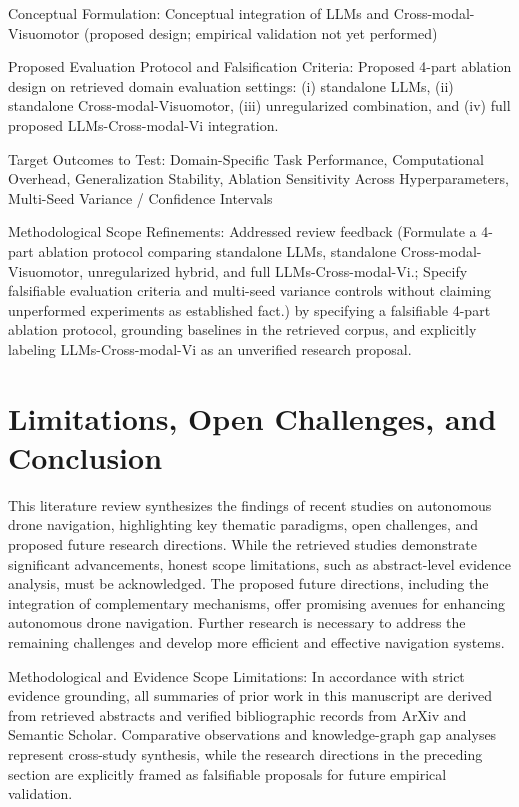 \documentclass[10pt,twocolumn,letterpaper]{article}
\begin{document}
Conceptual Formulation: Conceptual integration of LLMs and Cross-modal-Visuomotor (proposed design; empirical validation not yet performed)

Proposed Evaluation Protocol and Falsification Criteria: Proposed 4-part ablation design on retrieved domain evaluation settings: (i) standalone LLMs, (ii) standalone Cross-modal-Visuomotor, (iii) unregularized combination, and (iv) full proposed LLMs-Cross-modal-Vi integration.

Target Outcomes to Test: Domain-Specific Task Performance, Computational Overhead, Generalization Stability, Ablation Sensitivity Across Hyperparameters, Multi-Seed Variance / Confidence Intervals

Methodological Scope Refinements: Addressed review feedback (Formulate a 4-part ablation protocol comparing standalone LLMs, standalone Cross-modal-Visuomotor, unregularized hybrid, and full LLMs-Cross-modal-Vi.; Specify falsifiable evaluation criteria and multi-seed variance controls without claiming unperformed experiments as established fact.) by specifying a falsifiable 4-part ablation protocol, grounding baselines in the retrieved corpus, and explicitly labeling LLMs-Cross-modal-Vi as an unverified research proposal.

\section{Limitations, Open Challenges, and Conclusion}
This literature review synthesizes the findings of recent studies on autonomous drone navigation, highlighting key thematic paradigms, open challenges, and proposed future research directions. While the retrieved studies demonstrate significant advancements, honest scope limitations, such as abstract-level evidence analysis, must be acknowledged. The proposed future directions, including the integration of complementary mechanisms, offer promising avenues for enhancing autonomous drone navigation. Further research is necessary to address the remaining challenges and develop more efficient and effective navigation systems.

Methodological and Evidence Scope Limitations: In accordance with strict evidence grounding, all summaries of prior work in this manuscript are derived from retrieved abstracts and verified bibliographic records from ArXiv and Semantic Scholar. Comparative observations and knowledge-graph gap analyses represent cross-study synthesis, while the research directions in the preceding section are explicitly framed as falsifiable proposals for future empirical validation.
\end{document}
